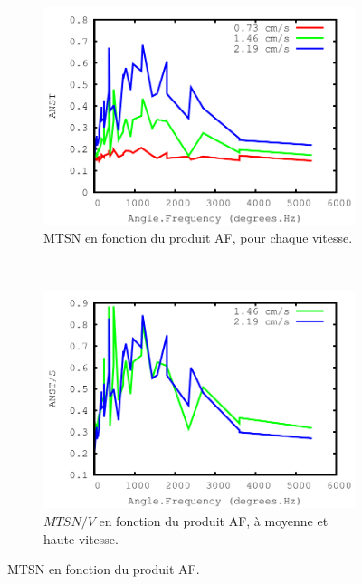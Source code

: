 	\begin{figure}[!htb]
		\begin{subfigure}[t]{0.49\textwidth}
			\centering
			\includegraphics[width=\textwidth]{figures/ch4/time_vs_AF_all_speeds}
			\caption{MTSN en fonction du produit AF, pour chaque vitesse.}
			\label{fig:tAFallSp}
		\end{subfigure}
		~
		\begin{subfigure}[t]{0.49\textwidth}
			\centering
			\includegraphics[width=\textwidth]{figures/ch4/time_vs_AF_all_speeds_normalized}
			\caption{$MTSN/V$ en fonction du produit AF, à moyenne et haute vitesse.}
			\label{fig:tAF_Spnorm}
		\end{subfigure}
		\caption[MTSN en fonction du produit AF]{MTSN en fonction du produit AF.}
		\label{fig:tAF}
	\end{figure}
	
